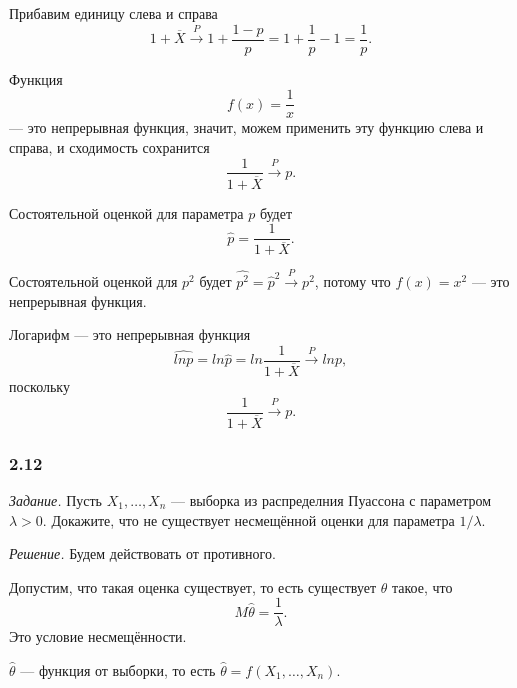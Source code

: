 Прибавим единицу слева и справа
$$1 + \overline{X} \overset{P}{ \to }
  1 + \frac{1 - p}{p} =
  1 + \frac{1}{p} - 1 =
  \frac{1}{p}.$$

Функция
$$f \left( x \right) =
  \frac{1}{x}$$
--- это непрерывная функция, значит, можем применить эту функцию слева и справа,
и сходимость сохранится
$$ \frac{1}{1 + \overline{X}} \overset{P}{ \to }
  p.$$

Состоятельной оценкой для параметра $p$ будет
$$ \hat{p} =
  \frac{1}{1 + \overline{X}}.$$

Состоятельной оценкой для $p^2$ будет $ \hat{p^2} = \hat{p}^2 \overset{P}{ \to } p^2$,
потому что $f \left( x \right) = x^2$ --- это непрерывная функция.

Логарифм --- это непрерывная функция
$$ \hat{ln p} =
  ln \hat{p} =
  ln \frac{1}{1 + \overline{X}} \overset{P}{ \to }
  ln p,$$
поскольку
$$ \frac{1}{1 + \overline{X}} \overset{P}{ \to }
  p.$$

\subsubsection*{2.12}

\textit{Задание.}
Пусть $X_1, \dotsc, X_n$ --- выборка из распределния Пуассона с параметром $ \lambda > 0$.
Докажите, что не существует несмещённой оценки для параметра $1 / \lambda $.

\textit{Решение.} Будем действовать от противного.

Допустим, что такая оценка существует, то есть существует $ \hat{ \theta }$ такое, что
$$M \hat{ \theta } =
  \frac{1}{ \lambda }.$$
Это условие несмещённости.

$ \hat{ \theta }$ --- функция от выборки,
то есть $ \hat{ \theta } = f \left( X_1, \dotsc, X_n \right) $.

